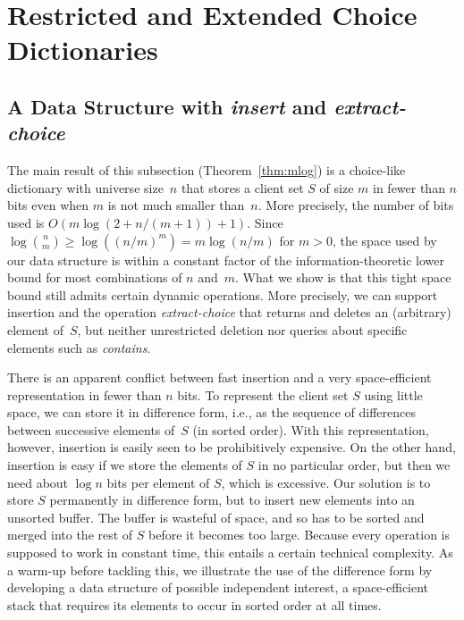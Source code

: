 \documentclass[envcountsame,envcountsect,undated,nolinenumbers]{lnthi}
\def\Tvn#1{\hbox{\textit{#1\/}}}
\begin{document}
\section{Restricted and Extended Choice Dictionaries}
\label{sec:other}

\subsection{A Data Structure with \Tvn{insert} and
 \Tvn{extract-choice}}
\label{subsec:mlog}

The main result of this subsection (Theorem~\ref{thm:mlog})
is a choice-like dictionary with universe size~$n$
that stores a client set $S$ of size $m$
in fewer than $n$ bits even when $m$ is not much
smaller than~$n$.
More precisely, the number of bits used is
$O(m\log(2+{n/{(m+1)}})+1)$.
Since $\log{n\choose m}\ge\log(({n/m})^m)
=m\log({n/m})$ for $m>0$, the space used by our
data structure is within a constant factor of the
information-theoretic lower bound for most
combinations of $n$ and~$m$.
What we show is that this tight space bound still
admits certain dynamic operations.
More precisely, we can support insertion and the
operation \Tvn{extract-choice} that returns and
deletes an (arbitrary) element of~$S$,
but neither unrestricted deletion nor queries
about specific elements such as \Tvn{contains}.

There is an apparent conflict between fast insertion
and a very space-efficient representation in
fewer than $n$ bits.
To represent the client set $S$ using little space, we
can store it in difference form, i.e., as the sequence of
differences between successive elements of~$S$
(in sorted order).
With this representation, however, insertion is
easily seen to be prohibitively expensive.
On the other hand, insertion is easy if we store the
elements of $S$ in no particular order, but then we
need about $\log n$ bits per element of $S$,
which is excessive.
Our solution is to store $S$ permanently in
difference form, but to insert new elements into an
unsorted buffer.
The buffer is wasteful of space, and so has to be
sorted and merged into the rest of $S$ before it
becomes too large.
Because every operation is supposed to work in constant time,
this entails a certain technical complexity.
As a warm-up before tackling this, we illustrate the
use of the difference form by developing a data
structure of possible independent interest, a
space-efficient stack that requires its elements
to occur in sorted order at all times.
\end{document}
